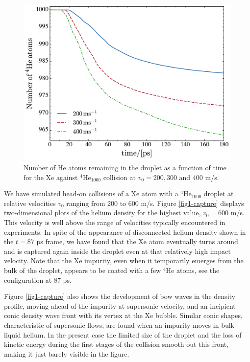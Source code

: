 %
\begin{figure}[!]
\centerline{\includegraphics[width=0.9\linewidth,clip]{nparticles}}
\caption{\label{fig4-capture} 
Number of He atoms remaining in the droplet as a function of time for the
Xe against $^4$He$_{1000}$ collision at $v_0 = 200, 300$ and 400 m/s.
}
\end{figure}

We have simulated head-on collisions of a Xe atom with a
$^4$He$_{1000}$ droplet at relative velocities $v_0$ 
ranging from 200 to 600 m/s.  Figure \ref{fig1-capture} 
displays two-dimensional plots of the helium density 
for the highest value, $v_0= 600$ m/s. This velocity is 
well above the range of velocities typically encountered
in experiments.\citep{Gom11,Gom14,Jon16}  
In spite of the appearance of disconnected helium density shown in the 
$t= 87$ ps frame, we have found that the Xe atom eventually 
turns around and is 
captured again inside the droplet even at that relatively high impact velocity. 
Note that the Xe impurity, even when it temporarily emerges from the bulk of the 
droplet, appears to be coated with a few
$^4$He atoms, see the configuration at 87 ps.

Figure \ref{fig1-capture}  also shows the development of bow waves in the density profile, moving 
ahead of the impurity at 
supersonic velocity, and
an incipient  conic  density wave front  with its vertex at the Xe bubble.
Similar conic shapes, characteristic of supersonic flows, 
are found when an impurity moves in bulk liquid helium. 
In the present case the limited size of the droplet and 
the loss of kinetic energy
during the first stages of the collision
smooth out this front, making it just barely visible in the figure.

